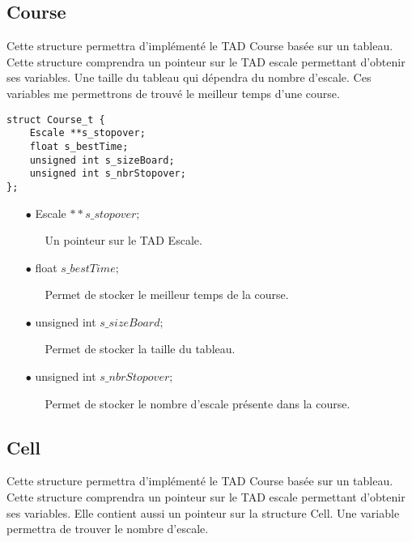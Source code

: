 \documentclass[a4paper, 11pt, oneside]{article}
\begin{document}
	\subsection{Course}

		Cette structure permettra d'implémenté le TAD Course basée sur un tableau.
	Cette structure comprendra un pointeur sur le TAD escale permettant d'obtenir ses variables.
	Une taille du tableau qui dépendra du nombre d'escale.
	Ces variables me permettrons de trouvé le meilleur temps d'une course.

		\begin{lstlisting}
struct Course_t {
	Escale **s_stopover;
	float s_bestTime;
	unsigned int s_sizeBoard;
	unsigned int s_nbrStopover;
};
		\end{lstlisting}

		\begin{itemize}
			\item[$\bullet$] Escale $**s\_stopover;$
			\begin{itemize}
				\item[] Un pointeur sur le TAD Escale.
			\end{itemize}
			\item[$\bullet$] float $s\_bestTime;$
			\begin{itemize}
				\item[] Permet de stocker le meilleur temps de la course.
			\end{itemize}
			\item[$\bullet$] unsigned int $s\_sizeBoard;$
			\begin{itemize}
				\item[] Permet de stocker la taille du tableau.
			\end{itemize}
			\item[$\bullet$] unsigned int $s\_nbrStopover;$
			\begin{itemize}
				\item[] Permet de stocker le nombre d'escale présente dans la course.
			\end{itemize}
		\end{itemize}

	\newpage

	\subsection{Cell}

			Cette structure permettra d'implémenté le TAD Course basée sur un tableau.
		Cette structure comprendra un pointeur sur le TAD escale permettant d'obtenir ses variables.
		Elle contient aussi un pointeur sur la structure Cell.
		Une variable permettra de trouver le nombre d'escale.
\end{document}
